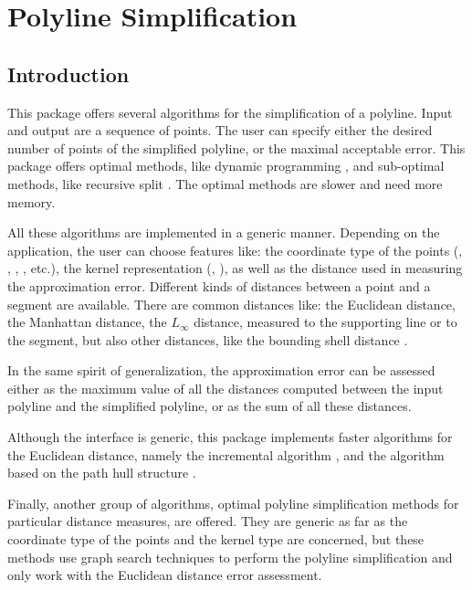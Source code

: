 \chapter{Polyline Simplification}
\label{chap:simplify_polyline}


\section{Introduction}

This package offers several algorithms for the simplification of a
polyline. Input and output are a sequence of points.  The user can
specify either the desired number of points of the simplified polyline,
or the maximal acceptable error. This package offers optimal methods, like
dynamic programming \cite{[cgal:gt-dpasrcp-93]}, and sub-optimal methods, 
like recursive split \cite{[dp-arnpr-73]}. The optimal methods
are slower and need more memory.

All these algorithms are implemented in a generic manner. Depending on
the application, the user can choose features like: the coordinate type of the
points (, , , ,
etc.), the kernel representation (, ),
as well as the distance used in measuring the approximation error.
Different kinds of distances between a point and a segment are available. 
There are common distances like: the Euclidean distance, the Manhattan distance,
the $L_\infty$ distance, measured to the supporting line or to the segment, but
also other distances, like the bounding shell distance \cite{[cgal:v-hal-94]}. 

In the same spirit of generalization, the approximation error can be assessed either as
the maximum value of all the distances computed between the input
polyline and the simplified polyline, or as the sum of all
these distances.

Although the interface is generic, this package implements faster algorithms
for the Euclidean distance, namely the incremental algorithm \cite{[cgal:pv-opadc-94]},
and the algorithm based on the path hull structure \cite{[hs-sudpl-92]}.

Finally, another group of algorithms, optimal polyline simplification methods
for particular distance measures, are offered. They are generic
as far as the coordinate type of the points and the kernel type are
concerned, but these methods use graph search techniques \cite{[cgal:ii-pac]} to
perform the polyline simplification and only work with the Euclidean distance error
assessment.

